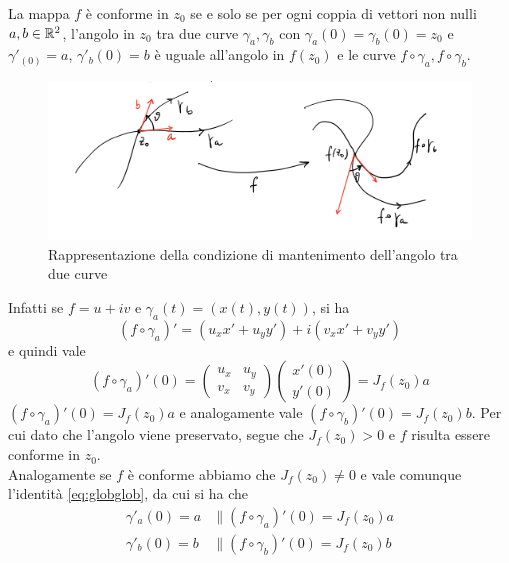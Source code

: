 \begin{remark}
  La mappa $f$ è conforme in $z_0$ se e solo se per ogni coppia di vettori non
  nulli $a,b \in \mathbb{R}^2$, l'angolo in $z_0$ tra due curve $\gamma_a, \gamma_b$ con
  $\gamma_a(0) = \gamma_b(0) = z_0$ e $\gamma'_(0) = a$, $\gamma'_b(0) = b$
  è uguale all'angolo in $f(z_0)$ e le curve $f \circ \gamma_a, f \circ
  \gamma_b$. \\

  \begin{figure}[h]
    \centering
    \includegraphics[width=0.6\linewidth]{images/analisi_complessa/es_mappa_conforme1.png}
    \caption{Rappresentazione della condizione di mantenimento dell'angolo tra
    due curve}
    \label{fig:mappe_conformi_1}
  \end{figure}

  Infatti se $f = u+iv$ e $\gamma_a(t) = (x(t), y(t))$, si ha 
  \begin{equation*}
    (f\circ \gamma_a)' = (u_x x' + u_y y') + i(v_x x' + v_y y')
  \end{equation*}
  e quindi vale 
  \begin{equation}
    \label{eq:globglob}
    (f\circ \gamma_a)'(0) = \left(\begin{array}{cc}
        u_x & u_y \\
        v_x & v_y 
    \end{array}\right) 
        \left(\begin{array}{c}
            x'(0) \\
            y'(0) 
        \end{array}\right) = J_f(z_0)a
  \end{equation}
  $(f\circ \gamma_a)'(0) = J_f(z_0) a$ e analogamente vale
  $(f\circ \gamma_b)'(0) = J_f(z_0) b$. Per cui dato che l'angolo viene 
  preservato, segue che $J_f(z_0) > 0$ e $f$ risulta essere conforme in $z_0$.\\

  Analogamente se $f$ è conforme abbiamo che $J_f(z_0) \neq 0$ e vale comunque
  l'identità \eqref{eq:globglob}, da cui si ha che 
  \begin{align*}
    \gamma'_a(0) = a & \parallel (f \circ \gamma_a)'(0) = J_f(z_0) a\\
    \gamma'_b(0) = b & \parallel (f \circ \gamma_b)'(0) = J_f(z_0) b
  \end{align*}
\end{remark}

